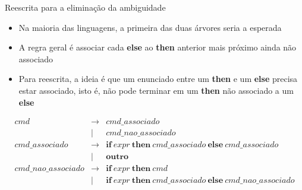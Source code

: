 \begin{frame}[fragile]{Reescrita para a eliminação da ambiguidade}

    \begin{itemize}
        \item Na maioria das linguagens, a primeira das duas árvores seria a esperada
        \pause

        \item A regra geral é associar cada \textbf{else} ao \textbf{then} anterior mais próximo ainda não associado
        \pause

        \item Para reescrita, a ideia é que um enunciado entre um \textbf{then} e um \textbf{else} precisa estar associado, isto é, não pode terminar em um
            \textbf{then} não associado a um \textbf{else}
        \pause
    \end{itemize}

    \[
        \begin{array}{rcl}
            cmd & \to & cmd\_associado \\
                & | & cmd\_nao\_associado \\
            cmd\_associado & \to & \textbf{if}\ expr\ \textbf{then}\ cmd\_associado\ \textbf{else}\ cmd\_associado \\
            & | & \textbf{outro} \\
            cmd\_nao\_associado & \to & \textbf{if}\ expr\ \textbf{then}\ cmd \\
            & | & \textbf{if}\ expr\ \textbf{then}\ cmd\_associado\ \textbf{else}\ cmd\_nao\_associado
        \end{array}
    \]
\end{frame}

